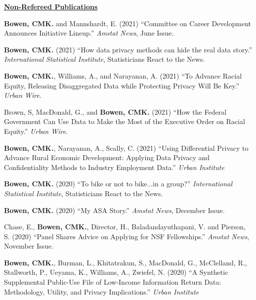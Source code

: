 \documentclass[11pt, letterpaper, roman]{moderncv} %
\begin{document}
\newpage
\noindent\underline{\textbf{Non-Refereed Publications}}
\vspace{4pt}
\begin{etaremune}[topsep=0pt, itemsep=3pt, partopsep=0pt, parsep=0pt]
    \item \textbf{Bowen, CMK.} and Mannshardt, E. (2021) ``Committee on Career Development Announces Initiative Lineup.'' \textit{Amstat News}, June Issue.

    \item \textbf{Bowen, CMK.} (2021) ``How data privacy methods can hide the real data story.'' \textit{International Statistical Institute}, Statisticians React to the News.
    
    \item \textbf{Bowen, CMK.}, Williams, A., and Narayanan, A. (2021) ``To Advance Racial Equity, Releasing Disaggregated Data while Protecting Privacy Will Be Key.'' \textit{Urban Wire}. 
    
    \item Brown, S, MacDonald, G., and \textbf{Bowen, CMK.} (2021) ``How the Federal Government Can Use Data to Make the Most of the Executive Order on Racial Equity.'' \textit{Urban Wire}. 

    \item \textbf{Bowen, CMK.}, Narayanan, A., Scally, C. (2021) ``Using Differential Privacy to Advance Rural Economic Development: Applying Data Privacy and Confidentiality Methods to Industry Employment Data.'' \textit{Urban Institute}

    \item \textbf{Bowen, CMK.} (2020) ``To bike or not to bike...in a group?'' \textit{International Statistical Institute}, Statisticians React to the News.

    \item \textbf{Bowen, CMK.} (2020) ``My ASA Story.'' \textit{Amstat News}, December Issue.

    \item Chase, E., \textbf{Bowen, CMK.}, Director, H., Baladandayuthapani, V. and Pierson, S. (2020) ``Panel Shares Advice on Applying for NSF Fellowships.'' \textit{Amstat News}, November Issue.

    \item \textbf{Bowen, CMK.}, Burman, L., Khitatrakun, S., MacDonald, G., McClelland, R., Stallworth, P., Ueyama, K., Williams, A., Zwiefel, N. (2020) ``A Synthetic Supplemental Public-Use File of Low-Income Information Return Data: Methodology, Utility, and Privacy Implications.'' \textit{Urban Institute}


\end{etaremune}
\end{document}
